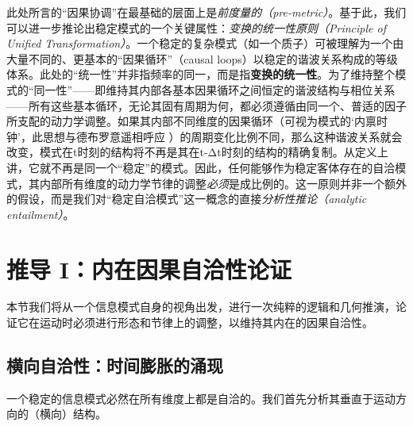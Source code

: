 \documentclass[12pt, a4paper]{article}
\begin{document}
此处所言的``因果协调''在最基础的层面上是\textit{前度量的（pre-metric）}。基于此，我们可以进一步推论出稳定模式的一个关键属性：\textit{变换的统一性原则（Principle of Unified Transformation）}。一个稳定的复杂模式（如一个质子）可被理解为一个由大量不同的、更基本的``因果循环''（causal loops）以稳定的谐波关系构成的等级体系。此处的``统一性''并非指频率的同一，而是指\textbf{变换的统一性}。为了维持整个模式的``同一性''——即维持其内部各基本因果循环之间恒定的谐波结构与相位关系——所有这些基本循环，无论其固有周期为何，都必须遵循由同一个、普适的因子所支配的动力学调整。如果其内部不同维度的因果循环（可视为模式的‘内禀时钟’，此思想与德布罗意遥相呼应 \cite{deBroglie1930}）的周期变化比例不同，那么这种谐波关系就会改变，模式在t时刻的结构将不再是其在t-Δt时刻的结构的精确复制。从定义上讲，它就不再是同一个``稳定''的模式。因此，任何能够作为稳定客体存在的自洽模式，其内部所有维度的动力学节律的调整\textit{必须}是成比例的。这一原则并非一个额外的假设，而是我们对``稳定自洽模式''这一概念的直接\textit{分析性推论（analytic entailment）}。

\section{推导 I：内在因果自洽性论证}

本节我们将从一个信息模式自身的视角出发，进行一次纯粹的逻辑和几何推演，论证它在运动时必须进行形态和节律上的调整，以维持其内在的因果自洽性。

\subsection{横向自洽性：时间膨胀的涌现}
一个稳定的信息模式必然在所有维度上都是自洽的。我们首先分析其垂直于运动方向的（横向）结构。
\end{document}

